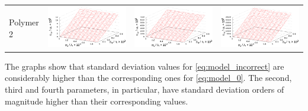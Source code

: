 \documentclass[11pt,a4paper]{article}
\theoremstyle{definition}
\begin{document}
\begin{table}[h]
\begin{tabular}{l | c c c}
	\begin{rotate}{90}Polymer 2\end{rotate} &	\includegraphics[scale=0.4]{figs/all/p2.txt_coeff0.dat.eps} & \includegraphics[scale=0.4]{figs/all/p2.txt_coeff1.dat.eps} & \includegraphics[scale=0.4]{figs/all/p2.txt_coeff2.dat.eps}
  \end{tabular}
  \label{tabl:res_incorrect}
\end{table}

The graphs show that standard deviation values for \eqref{eq:model_incorrect}
are considerably higher than the corresponding ones for \eqref{eq:model_0}.
The second, third and fourth parameters, in particular, have standard deviation
orders of magnitude higher than their corresponding values.
\end{document}
